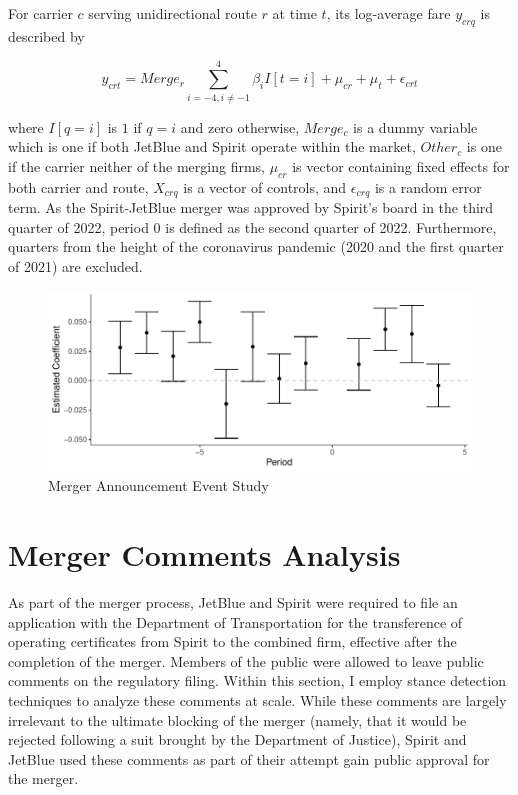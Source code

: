 \documentclass{article}
\begin{document}
\begin{appendices}
    For carrier $c$ serving unidirectional route $r$ at time $t$, its log-average fare $y_{crq}$ is described by 

    \[y_{crt} = Merge_{r} \sum_{i = - 4, i \neq -1}^{4} \beta_{i}I[t = i]  + \mu_{cr} + \mu_{t} + \epsilon_{crt}\]

    where $I[q = i]$ is $1$ if $q = i$ and zero otherwise, $Merge_{c}$ is a dummy variable which is one if both JetBlue and Spirit operate within the market, $Other_c$ is one if the carrier neither of the merging firms, $\mu_{cr}$ is vector containing fixed effects for both carrier and route, $X_{crq}$ is a vector of controls, and $\epsilon_{crq}$ is a random error term. As the Spirit-JetBlue merger was approved by Spirit's board in the third quarter of 2022, period $0$ is defined as the second quarter of 2022. Furthermore, quarters from the height of the coronavirus pandemic (2020 and the first quarter of 2021) are excluded. 

    \begin{figure}
    \caption{Merger Announcement Event Study}
    \label{fig:MergerAnnouncement_Plot}
    \includegraphics[width = \linewidth]{05.Figures/Merger_Anticipate_Figure.pdf}
    \end{figure}

    \FloatBarrier
	\section{Merger Comments Analysis}
    \label{sec:NaturalLanguage}

    \setcounter{table}{0}
    \setcounter{figure}{0}


As part of the merger process, JetBlue and Spirit were required to file an application with the Department of Transportation for the transference of operating certificates from Spirit to the combined firm, effective after the completion of the merger. Members of the public were allowed to leave public comments on the regulatory filing. Within this section, I employ stance detection techniques to analyze these comments at scale. While these comments are largely irrelevant to the ultimate blocking of the merger (namely, that it would be rejected following a suit brought by the Department of Justice), Spirit and JetBlue used these comments as part of their attempt gain public approval for the merger.


\end{appendices}
\end{document}
